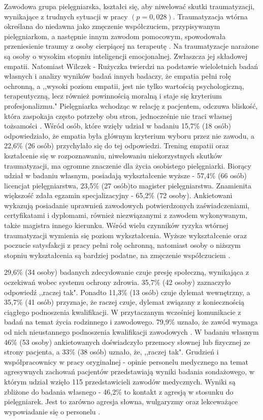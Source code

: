 \documentclass[a4paper,12pt,twoside,openright]{mwrep}
\begin{document}
Zawodowa grupa pielęgniarska, kształci się, aby niwelować skutki traumatyzacji, wynikające z trudnych sytuacji w pracy $(p=0,028)$. Traumatyzacja wtórna określana do niedawna jako zmęczenie współczuciem, przypisywanym pielęgniarkom, a następnie innym zawodom pomocowym, spowodowała przeniesienie traumy z osoby cierpiącej  na terapeutę \cite{figley}. Na traumatyzacje narażone są osoby o wysokim stopniu inteligencji emocjonalnej. Zwłaszcza jej składowej empatii. Natomiast Wilczek - Rużyczka twierdzi na podstawie wieloletnich badań własnych i analizy wyników badań innych badaczy, że empatia pełni rolę ochronną, a ,,wysoki poziom empatii, jest nie tylko wartością psychologiczną, terapeutyczną, lecz również powinnością moralną i staje się kryterium profesjonalizmu."  Pielęgniarka wchodząc w relację z pacjentem, odczuwa bliskość, która zaspokaja często potrzeby obu stron, jednocześnie nie traci własnej tożsamości \cite{wilczek}. Wśród osób, które wzięły udział w badaniu  15,7\% (18 osób) odpowiedziało, że empatia była głównym kryterium wyboru przez nie zawodu, a 22,6\% (26 osób) przychylało się do tej odpowiedzi. Trening empatii oraz kształcenie się w  rozpoznawaniu, niwelowaniu niekorzystnych skutków traumatyzacji,  ma ogromne znaczenie dla życia osobistego pielęgniarki. Biorący udział w badaniu własnym,  posiadają wykształcenie wyższe - 57,4\% (66 osób) licencjat pielęgniarstwa,  23,5\% (27 osób)to magister pielęgniarstwa. Znamienita większość zdała egzamin specjalizacyjny - 65,2\% (72 osoby). Ankietowani wykazują posiadanie uprawnień zawodowych potwierdzonych zaświadczeniami, certyfikatami i dyplomami, również niezwiązanymi z zawodem wykonywanym, także magistra innego kierunku. Wśród wielu czynników ryzyka wtórnej traumatyzacji wymienia się poziom wykształcenia. Wyższe wykształcenie oraz poczucie satysfakcji z pracy pełni rolę ochronną, natomiast osoby o niższym stopniu wykształcenia są bardziej podatne, na zmęczenie współczuciem \cite{oginska}.



29,6\% (34 osoby) badanych zdecydowanie czuje presję społeczną, wynikająca z oczekiwań wobec systemu ochrony zdrowia. 35,7\% (42 osoby) zaznaczyło odpowiedź ,,raczej tak". Ponadto 11,3\% (13 osób)  czuje dylemat wewnętrzny, a 35,7\%  (41 osób) przyznaje, że raczej czuje, dylemat związany z koniecznością ciągłego podnoszenia kwalifikacji. W przytaczanym wcześniej komunikacie z badań na temat życia rodzinnego i zawodowego. 79,9\% uznało, że zawód wymaga od nich nieustannego podnoszenia kwalifikacji zawodowych \cite{komunikat}. W badaniu własnym 46\% (53 osoby) ankietowanych doświadczyło przemocy słownej lub fizycznej ze strony pacjenta, a 33\% (38 osób) uznało, że, ,,raczej tak".  Grudzień i współpracownicy w pracy oryginalnej - opinie personelu medycznego na temat agresywnych zachowań pacjentów przedstawiają wyniki badania sondażowego, w którym udział wzięło 115 przedstawicieli zawodów medycznych. Wyniki są zbliżone do badania własnego - 46,2\% to kontakt z agresją w stosunku do pielęgniarek. Jest to zarówno agresja słowna, wulgaryzmy oraz lekceważące wypowiadanie się o personelu \cite{grudzien}. 
\end{document}
